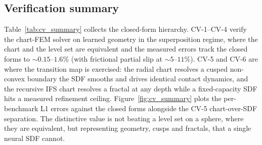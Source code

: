 \subsection{Verification summary}\label{sec:verif_summary}

Table~\ref{tab:cv_summary} collects the closed-form hierarchy. CV-1--CV-4 verify the chart-FEM solver
on learned geometry in the superposition regime, where the chart and the level set are equivalent and
the measured errors track the closed forms to $\sim0.15$--$1.6\%$ (with frictional partial slip at
$\sim5$--$11\%$). CV-5 and CV-6 are where the transition map is exercised: the radial chart resolves a
cusped non-convex boundary the SDF smooths and drives identical contact dynamics, and the recursive IFS
chart resolves a fractal at any depth while a fixed-capacity SDF hits a measured refinement ceiling.
Figure~\ref{fig:cv_summary} plots the per-benchmark L1 errors against the closed forms alongside the
CV-5 chart-over-SDF separation. The distinctive value is not beating a level set on a sphere, where
they are equivalent, but representing geometry, cusps and fractals, that a single neural SDF cannot.

